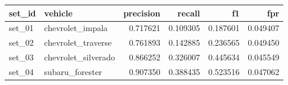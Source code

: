 \begin{tabular}{llrrrr}
\toprule
set_id & vehicle & precision & recall & f1 & fpr \\
\midrule
set_01 & chevrolet_impala & 0.717621 & 0.109305 & 0.187601 & 0.049407 \\
set_02 & chevrolet_traverse & 0.761893 & 0.142885 & 0.236565 & 0.049450 \\
set_03 & chevrolet_silverado & 0.866252 & 0.326007 & 0.445634 & 0.045549 \\
set_04 & subaru_forester & 0.907350 & 0.388435 & 0.523516 & 0.047062 \\
\bottomrule
\end{tabular}

